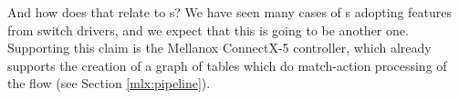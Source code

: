 And how does that relate to s? We have seen many cases of s adopting
features from switch drivers, and we expect that this is going to be another
one. Supporting this claim is the Mellanox ConnectX-5 controller, which already
supports the creation of a graph of tables which do match-action processing of
the flow (see Section \ref{mlx:pipeline}).



%
% 
%

